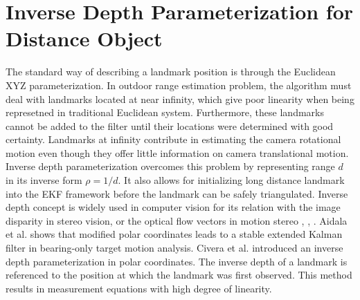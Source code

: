 \section{Inverse Depth Parameterization for Distance Object}
The standard way of describing a landmark position is through the
Euclidean XYZ parameterization. In outdoor range estimation problem,
the algorithm must deal with landmarks located at near infinity, which
give poor linearity when being represetned in traditional Euclidean
system. Furthermore, these landmarks cannot be added to the filter
until their locations were determined with good certainty. Landmarks
at infinity contribute in estimating the camera rotational motion even
though they offer little information on camera translational motion.
Inverse depth parameterization overcomes this problem by representing
range $d$ in its inverse form $\rho =1/d$. It also allows for
initializing long distance landmark into the EKF framework before the
landmark can be safely triangulated. Inverse depth concept is widely
used in computer vision for its relation with the image disparity in
stereo vision, or the optical flow vectors in motion stereo
\cite{okutomi_multiple-baseline_1991}, \cite{jepson_fast_1991},
\cite{chowdhury_stochastic_2003}. Aidala et al.
\cite{aidala_utilization_1983} shows that modified polar coordinates
leads to a stable extended Kalman filter in bearing-only target motion
analysis. Civera et al. \cite{civera_inverse_2008} introduced an
inverse depth parameterization in polar coordinates. The inverse depth
of a landmark is referenced to the position at which the landmark was
first observed. This method results in measurement equations with high
degree of linearity.






